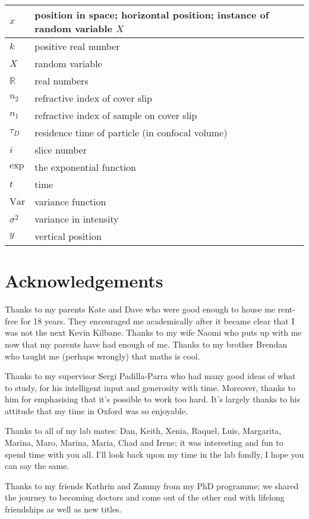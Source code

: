 \documentclass[12pt,]{book}
\theoremstyle{definition}
\theoremstyle{definition}
\theoremstyle{definition}
\theoremstyle{remark}
\begin{document}
\begin{longtable}{l|l}
\hline
$x$ & position in space; horizontal position; instance of random variable $X$\\
\hline
$k$ & positive real number\\
\hline
$X$ & random variable\\
\hline
$\mathbb{R}$ & real numbers\\
\hline
$n_2$ & refractive index of cover slip\\
\hline
$n_1$ & refractive index of sample on cover slip\\
\hline
$\tau_D$ & residence time of particle (in confocal volume)\\
\hline
$i$ & slice number\\
\hline
$\text{exp}$ & the exponential function\\
\hline
$t$ & time\\
\hline
$\text{Var}$ & variance function\\
\hline
$\sigma^2$ & variance in intensity\\
\hline
$y$ & vertical position\\
\hline
\end{longtable}

\section*{Acknowledgements}\label{acknowledgements}

Thanks to my parents Kate and Dave who were good enough to house me
rent-free for 18 years. They encouraged me academically after it became
clear that I was not the next Kevin Kilbane. Thanks to my wife Naomi who
puts up with me now that my parents have had enough of me. Thanks to my
brother Brendan who taught me (perhaps wrongly) that maths is cool.

Thanks to my supervisor Sergi Padilla-Parra who had many good ideas of
what to study, for his intelligent input and generosity with time.
Moreover, thanks to him for emphasising that it's possible to work too
hard. It's largely thanks to his attitude that my time in Oxford was so
enjoyable.

Thanks to all of my lab mates: Dan, Keith, Xenia, Raquel, Luis,
Margarita, Marina, Maro, Marina, Maria, Chad and Irene; it was
interesting and fun to spend time with you all. I'll look back upon my
time in the lab fondly, I hope you can say the same.

Thanks to my friends Kathrin and Zammy from my PhD programme; we shared
the journey to becoming doctors and come out of the other end with
lifelong friendships as well as new titles.
\end{document}
